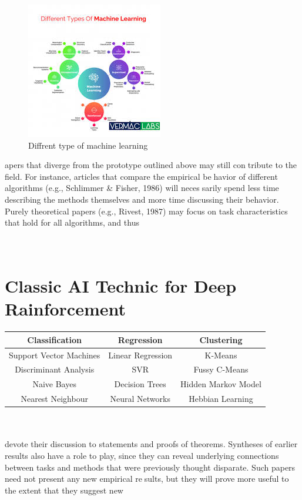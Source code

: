 \documentclass{article}
\begin{document}
\begin{figure}
    \centering
   \includegraphics[width=0.8\linewidth]{types of Machine learning.jpg}
       \caption{Diffrent type of machine learning}
    \label{fig:Diffrent type of machine learning}
\end{figure}

apers that diverge from the prototype outlined above may still contribute to the field. For instance, articles that compare the empirical behavior of different algorithms (e.g., Schlimmer & Fisher, 1986) will necessarily spend less time describing the methods themselves and more time
discussing their behavior. Purely theoretical papers (e.g., Rivest, 1987)
may focus on task characteristics that hold for all algorithms, and thus\\\\\
\section{Classic AI Technic for Deep Rainforcement}

\begin{tabular}{|c|c|c|}

\hline
\textbf{Classification} & \textbf{Regression} & \textbf{Clustering} \\
\hline
Support Vector Machines & Linear Regression & K-Means \\
\hline
Discriminant Analysis & SVR & Fussy C-Means \\
\hline
Naive Bayes & Decision Trees & Hidden Markov Model \\
\hline
Nearest Neighbour & Neural Networks & Hebbian Learning \\
\hline
\end{tabular}\\\\
devote their discussion to statements and proofs of theorems.
Syntheses of earlier results also have a role to play, since they can reveal
underlying connections between tasks and methods that were previously
thought disparate. Such papers need not present any new empirical results, but they will prove more useful to the extent that they suggest new
\end{document}

